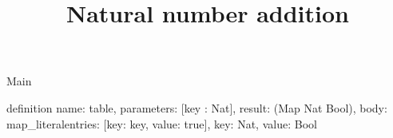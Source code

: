 \begin{lexlean}{Main}
\title{Natural number addition}
\begin{semanticmodule}
definition{
  name: table,
  parameters: [key : Nat],
  result: (Map Nat Bool),
  body: map_literal{entries: [{key: key, value: true}], key: Nat, value: Bool}
}
\end{semanticmodule}
\end{lexlean}
